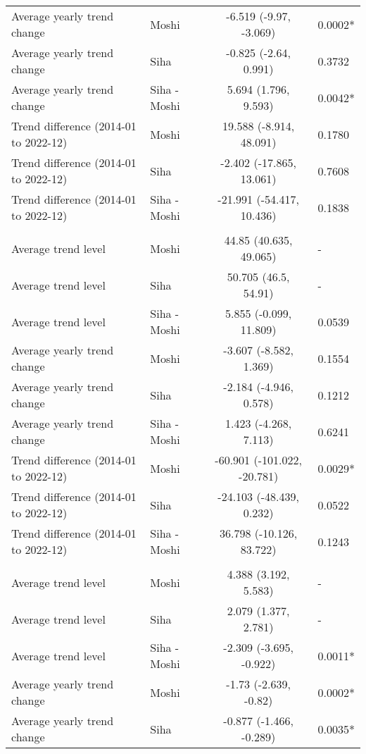 \begin{longtable}{l|lcl}
Average yearly trend change & Moshi & -6.519 (-9.97, -3.069) & 0.0002* \\ 
Average yearly trend change & Siha & -0.825 (-2.64, 0.991) & 0.3732 \\ 
Average yearly trend change & Siha - Moshi & 5.694 (1.796, 9.593) & 0.0042* \\ 
Trend difference (2014-01 to 2022-12) & Moshi & 19.588 (-8.914, 48.091) & 0.1780 \\ 
Trend difference (2014-01 to 2022-12) & Siha & -2.402 (-17.865, 13.061) & 0.7608 \\ 
Trend difference (2014-01 to 2022-12) & Siha - Moshi & -21.991 (-54.417, 10.436) & 0.1838 \\ 
\midrule\addlinespace[2.5pt]
\multicolumn{4}{l}{Road Traffic Accidents} \\ 
\midrule\addlinespace[2.5pt]
Average trend level & Moshi & 44.85 (40.635, 49.065) & - \\ 
Average trend level & Siha & 50.705 (46.5, 54.91) & - \\ 
Average trend level & Siha - Moshi & 5.855 (-0.099, 11.809) & 0.0539 \\ 
Average yearly trend change & Moshi & -3.607 (-8.582, 1.369) & 0.1554 \\ 
Average yearly trend change & Siha & -2.184 (-4.946, 0.578) & 0.1212 \\ 
Average yearly trend change & Siha - Moshi & 1.423 (-4.268, 7.113) & 0.6241 \\ 
Trend difference (2014-01 to 2022-12) & Moshi & -60.901 (-101.022, -20.781) & 0.0029* \\ 
Trend difference (2014-01 to 2022-12) & Siha & -24.103 (-48.439, 0.232) & 0.0522 \\ 
Trend difference (2014-01 to 2022-12) & Siha - Moshi & 36.798 (-10.126, 83.722) & 0.1243 \\ 
\midrule\addlinespace[2.5pt]
\multicolumn{4}{l}{Schistosomiasis} \\ 
\midrule\addlinespace[2.5pt]
Average trend level & Moshi & 4.388 (3.192, 5.583) & - \\ 
Average trend level & Siha & 2.079 (1.377, 2.781) & - \\ 
Average trend level & Siha - Moshi & -2.309 (-3.695, -0.922) & 0.0011* \\ 
Average yearly trend change & Moshi & -1.73 (-2.639, -0.82) & 0.0002* \\ 
Average yearly trend change & Siha & -0.877 (-1.466, -0.289) & 0.0035* \\ 

\end{longtable}

